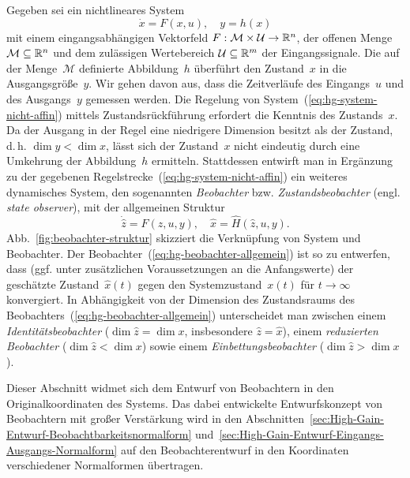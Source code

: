 Gegeben sei ein nichtlineares System
\begin{equation}
\dot{x}=F(x,u),\quad y=h(x)\label{eq:hg-system-nicht-affin}
\end{equation}
mit einem eingangsabhängigen Vektorfeld $F:\mathcal{M}\times\mathcal{U}\to{\mathbb{R}}^{n}$,
der offenen Menge $\mathcal{M}\subseteq{\mathbb{R}}^{n}$ und dem zulässigen
Wertebereich $\mathcal{U}\subseteq{\mathbb{R}}^{m}$ der Eingangs\-signale.
Die auf der Menge~$\mathcal{M}$ definierte Abbildung~$h$ überführt
den Zustand~$x$ in die Ausgangsgröße~$y$. Wir gehen davon aus,
dass die Zeitverläufe des Eingangs~$u$ und des Ausgangs~$y$ gemessen
werden. Die Regelung von System~(\ref{eq:hg-system-nicht-affin})
mittels Zustandsrückführung erfordert die Kenntnis des Zustands~$x$.
Da der Ausgang in der Regel eine niedrigere Dimension besitzt als
der Zustand, d.\,h. $\dim y<\dim x$, lässt sich der Zustand~$x$
nicht eindeutig durch eine Umkehrung der Abbildung~$h$ ermitteln.
Stattdessen entwirft man in Ergänzung zu der gegebenen Regelstrecke~(\ref{eq:hg-system-nicht-affin})
ein weiteres dynamisches System, den sogenannten \emph{Beobachter}
bzw. \emph{Zustandsbeobachter} (engl. \emph{state observer}), mit
der allgemeinen Struktur
\begin{equation}
\dot{\hat{z}}=\hat{F}(\hat{z},u,y),\quad\hat{x}=\hat{H}(\hat{z},u,y).\label{eq:hg-beobachter-allgemein}
\end{equation}
Abb.~\ref{fig:beobachter-struktur} skizziert die Verknüpfung von
System und Beobachter. Der Beobachter~(\ref{eq:hg-beobachter-allgemein})
ist so zu entwerfen, dass (ggf. unter zusätzlichen Voraussetzungen
an die Anfangswerte) der geschätzte Zustand~$\hat{x}(t)$ gegen den
Systemzustand~$x(t)$ für $t\to\infty$ konvergiert. In Abhängigkeit
von der Dimension des Zustandsraums des Beobachters~(\ref{eq:hg-beobachter-allgemein})
unterscheidet man zwischen einem \emph{Identitätsbeobachter} ($\dim\hat{z}=\dim x$,
insbesondere $\hat{z}=\hat{x}$), einem \emph{reduzierten Beobachter}
($\dim\hat{z}<\dim x$) sowie einem \emph{Einbettungsbeobachter}
($\dim\hat{z}>\dim x$).

Dieser Abschnitt widmet sich dem Entwurf von Beobachtern in den Originalkoordinaten
des Systems. Das dabei entwickelte Entwurfskonzept von Beobachtern
mit großer Verstärkung wird in den Abschnitten~\ref{sec:High-Gain-Entwurf-Beobachtbarkeitsnormalform}
und~\ref{sec:High-Gain-Entwurf-Eingangs-Ausgangs-Normalform} auf
den Beobachterentwurf in den Koordinaten verschiedener Normalformen
übertragen.

